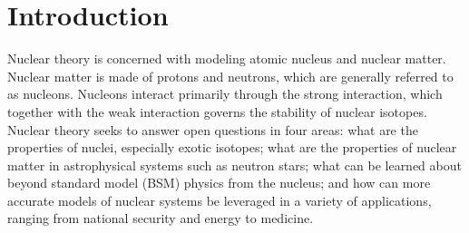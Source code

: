 \chapter{Introduction}\label{introduction}



Nuclear theory is concerned with modeling atomic nucleus and nuclear matter. Nuclear matter is made of protons and neutrons, which are generally referred to as nucleons. Nucleons interact primarily through the strong interaction, which together with the weak interaction governs the stability of nuclear isotopes. Nuclear theory seeks to answer open questions in four areas: what are the properties of nuclei, especially exotic isotopes; what are the properties of nuclear matter in astrophysical systems such as neutron stars; what can be learned about beyond standard model (BSM) physics from the nucleus; and how can more accurate models of nuclear systems be leveraged in a variety of applications, ranging from national security and energy to medicine.

